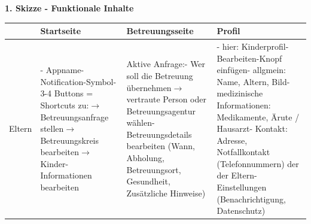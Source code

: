 \newpage
\textbf{1. Skizze - Funktionale Inhalte}
\begin{table}[h]
\centering
\begin{tabularx}{\linewidth}{|l|X|X|X|}
\hline
    & Startseite  & Betreuungsseite  & Profil  \\ \hline
                 
Eltern
& - Appname\newline - Notification-Symbol\newline - 3-4 Buttons = Shortcuts zu:\newline $\rightarrow$  Betreuungsanfrage stellen\newline $\rightarrow$ Betreuungskreis bearbeiten\newline $\rightarrow$ Kinder-Informationen bearbeiten
& Aktive Anfrage:\newline - Wer soll die Betreuung übernehmen\newline $\rightarrow$ vertraute Person oder Betreuungsagentur wählen\newline - Betreuungsdetails bearbeiten (Wann, Abholung, Betreuungsort, Gesundheit, Zusätzliche Hinweise)
& - hier: Kinderprofil\newline - Bearbeiten-Knopf einfügen\newline - allgmein: Name, Altern, Bild\newline - medizinische Informationen: Medikamente, Ärute / Hausarzt\newline - Kontakt: Adresse, Notfallkontakt (Telefonnummern) der der Eltern\newline - Einstellungen (Benachrichtigung, Datenschutz)                                                                                                         \\ \hline


\end{tabularx}
\end{table}
